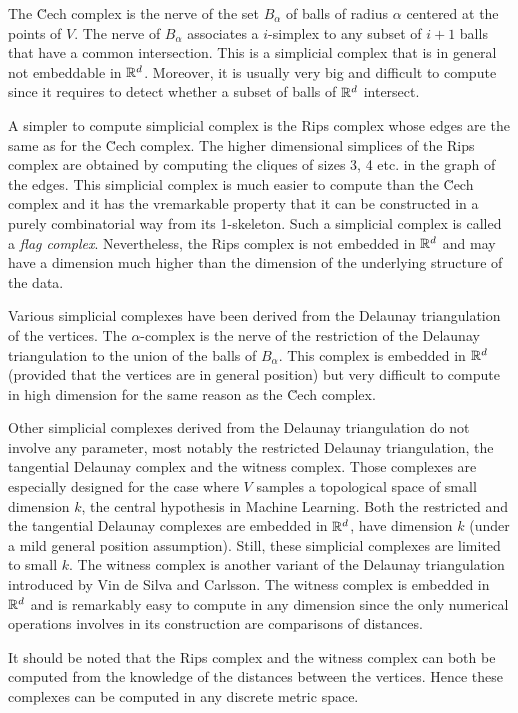 The \u{C}ech complex is the nerve of the set $B_{\alpha}$ of balls of
radius $\alpha$ centered at the points of $V$. The nerve of
$B_{\alpha}$  associates a
$i$-simplex to any subset of $i+1$ balls that have a common
intersection. This is a simplicial
complex that is in general not embeddable in $\mathbb R ^d$. Moreover, it is usually very big and
difficult to compute since it requires to detect whether a subset of
balls of  $\mathbb R ^d$ intersect. 

A simpler to compute simplicial complex is the Rips complex whose
edges are the same as for the \u{C}ech complex. The higher dimensional
simplices of the Rips complex are obtained by computing the cliques of
sizes 3, 4 etc. in the graph of the edges. This simplicial complex is
much easier to compute than the \u{C}ech complex and it has the
vremarkable property that it can be constructed in a purely
combinatorial way from 
its 1-skeleton.  Such a simplicial complex is called a {\em flag
  complex}. Nevertheless, the Rips complex is not embedded in $\mathbb R ^d$
and may have a dimension much higher than the dimension of the underlying structure
of the data.


Various simplicial complexes have been derived from the Delaunay
triangulation of the vertices. The $\alpha$-complex is the nerve of
the restriction of the Delaunay triangulation to the union of the
balls of $B_{\alpha}$. This complex is embedded in $\mathbb R^d$ (provided
that the vertices are in general position) but very difficult to
compute in high dimension for the same reason as the \u{C}ech complex.

Other simplicial complexes derived from the Delaunay triangulation do
not involve any parameter, most notably the restricted Delaunay
triangulation, the tangential Delaunay complex and the witness
complex. Those complexes are
especially designed for the case where $V$ samples a topological space
of small dimension $k$, the central hypothesis in Machine
Learning. Both the restricted and the tangential Delaunay complexes are embedded in $\mathbb R^d$, have dimension $k$
(under a mild general position assumption). Still, these simplicial
complexes are limited to small $k$.  The witness complex is
another variant of the Delaunay triangulation introduced by
Vin de Silva and Carlsson. The witness complex is embedded in $\mathbb R ^d$
and is remarkably easy to compute in any dimension
since the only numerical operations involves in its construction are
comparisons of distances.

It should be noted that the Rips complex and the witness complex can
both be computed from the knowledge of the distances between the
vertices. Hence these complexes can be computed in any discrete metric
space.

